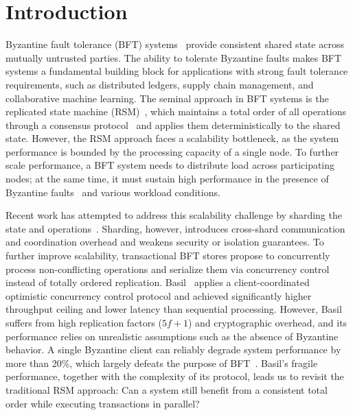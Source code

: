 \section{Introduction}
\label{sec:intro}

Byzantine fault tolerance (BFT) systems~\cite{pbft,gueta2019sbft,hotstuff,bullshark,giridharan2024autobahn,mysticeti,suri2021basil} provide consistent shared state across mutually untrusted parties.
The ability to tolerate Byzantine faults makes BFT systems a fundamental building block for applications with strong fault tolerance requirements, such as distributed ledgers, supply chain management, and collaborative machine learning.
The seminal approach in BFT systems is the replicated state machine (RSM)~\cite{rsm}, which maintains a total order of all operations through a consensus protocol~\cite{pbft} and applies them deterministically to the shared state.
However, the RSM approach faces a scalability bottleneck, as the system performance is bounded by the processing capacity of a single node.
To further scale performance, a BFT system needs to distribute load across participating nodes;
at the same time, it must sustain high performance in the presence of Byzantine faults~\cite{bft-bft} and various workload conditions.

Recent work has attempted to address this scalability challenge by sharding the state and operations~\cite{el2019blockchaindb, amiri2021sharper, hellings2021byshard, hong2024gridb}.
Sharding, however, introduces cross-shard communication and coordination overhead and weakens security or isolation guarantees.
To further improve scalability, transactional BFT stores propose to concurrently process non-conflicting operations and serialize them via concurrency control instead of totally ordered replication.
Basil~\cite{suri2021basil} applies a client-coordinated optimistic concurrency control protocol and achieved significantly higher throughput ceiling and lower latency than sequential processing.
However, Basil suffers from high replication factors ($5f + 1$) and cryptographic overhead, and its performance relies on unrealistic assumptions such as the absence of Byzantine behavior.
A single Byzantine client can reliably degrade system performance by more than 20\%, which largely defeats the purpose of BFT~\cite{bft-bft}.
Basil's fragile performance, together with the complexity of its protocol, leads us to revisit the traditional RSM approach:
Can a system still benefit from a consistent total order while executing transactions in parallel?

